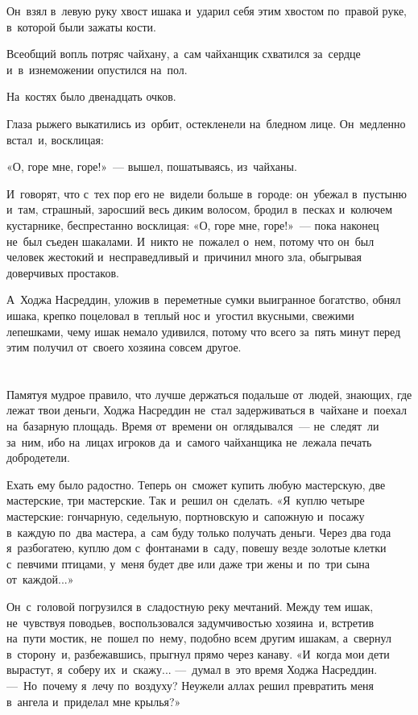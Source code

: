 \documentclass[12pt,a4paper]{book}
\begin{document}
Он~взял в~левую руку хвост ишака и~ударил себя этим хвостом по~правой руке, в~которой были зажаты кости.

Всеобщий вопль потряс чайхану, а~сам чайханщик схватился за~сердце и~в~изнеможении опустился на~пол.

На~костях было двенадцать очков.

Глаза рыжего выкатились из~орбит, остекленели на~бледном лице. Он~медленно встал~и, восклицая:

«О, горе мне, горе!»~— вышел, пошатываясь, из~чайханы.

И~говорят, что с~тех пор его не~видели больше в~городе: он~убежал в~пустыню и~там, страшный, заросший весь диким волосом, бродил в~песках и~колючем кустарнике, беспрестанно восклицая: «О, горе мне, горе!»~— пока наконец не~был съеден шакалами. И~никто не~пожалел о~нем, потому что он~был человек жестокий и~несправедливый и~причинил много зла, обыгрывая доверчивых простаков.

А~Ходжа Насреддин, уложив в~переметные сумки выигранное богатство, обнял ишака, крепко поцеловал в~теплый нос и~угостил вкусными, свежими лепешками, чему ишак немало удивился, потому что всего за~пять минут перед этим получил от~своего хозяина совсем другое.


\chapter{}

Памятуя мудрое правило, что лучше держаться подальше от~людей, знающих, где лежат твои деньги, Ходжа Насреддин не~стал задерживаться в~чайхане и~поехал на~базарную площадь. Время от~времени он~оглядывался~— не~следят~ли за~ним, ибо на~лицах игроков да~и~самого чайханщика не~лежала печать добродетели.

Ехать ему было радостно. Теперь он~сможет купить любую мастерскую, две мастерские, три мастерские. Так и~решил он~сделать. «Я~куплю четыре мастерские: гончарную, седельную, портновскую и~сапожную и~посажу в~каждую по~два мастера, а~сам буду только получать деньги. Через два года я~разбогатею, куплю дом с~фонтанами в~саду, повешу везде золотые клетки с~певчими птицами, у~меня будет две или даже три жены и~по~три сына от~каждой...»

Он~с~головой погрузился в~сладостную реку мечтаний. Между тем ишак, не~чувствуя поводьев, воспользовался задумчивостью хозяина~и, встретив на~пути мостик, не~пошел по~нему, подобно всем другим ишакам, а~свернул в~сторону~и, разбежавшись, прыгнул прямо через канаву. «И~когда мои дети вырастут, я~соберу их~и~скажу... —~думал в~это время Ходжа Насреддин. —~Но~почему я~лечу по~воздуху? Неужели аллах решил превратить меня в~ангела и~приделал мне крылья?»
\end{document}
